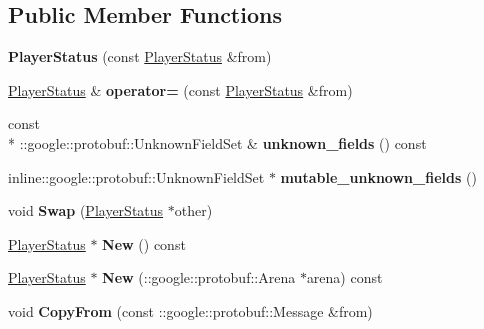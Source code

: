 \subsection*{Public Member Functions}
\begin{DoxyCompactItemize}
\item 
\hypertarget{class_player_status_a8869154aa29284c289564424ca3d81ca}{{\bfseries Player\-Status} (const \hyperlink{class_player_status}{Player\-Status} \&from)}\label{class_player_status_a8869154aa29284c289564424ca3d81ca}

\item 
\hypertarget{class_player_status_ad1150a8edc62109ee1ae7417ee476025}{\hyperlink{class_player_status}{Player\-Status} \& {\bfseries operator=} (const \hyperlink{class_player_status}{Player\-Status} \&from)}\label{class_player_status_ad1150a8edc62109ee1ae7417ee476025}

\item 
\hypertarget{class_player_status_ab7eee10cff7a50c69725159cf290352c}{const \\*
\-::google\-::protobuf\-::\-Unknown\-Field\-Set \& {\bfseries unknown\-\_\-fields} () const }\label{class_player_status_ab7eee10cff7a50c69725159cf290352c}

\item 
\hypertarget{class_player_status_abed60d55b4bcce83f29d29c1fe9c768e}{inline\-::google\-::protobuf\-::\-Unknown\-Field\-Set $\ast$ {\bfseries mutable\-\_\-unknown\-\_\-fields} ()}\label{class_player_status_abed60d55b4bcce83f29d29c1fe9c768e}

\item 
\hypertarget{class_player_status_a54451e7148d8bfc7ec996ff95296fbb6}{void {\bfseries Swap} (\hyperlink{class_player_status}{Player\-Status} $\ast$other)}\label{class_player_status_a54451e7148d8bfc7ec996ff95296fbb6}

\item 
\hypertarget{class_player_status_a5f463e20d20428030476245da9d6d52a}{\hyperlink{class_player_status}{Player\-Status} $\ast$ {\bfseries New} () const }\label{class_player_status_a5f463e20d20428030476245da9d6d52a}

\item 
\hypertarget{class_player_status_a05abd2f0659614a206ca97ac55cfece0}{\hyperlink{class_player_status}{Player\-Status} $\ast$ {\bfseries New} (\-::google\-::protobuf\-::\-Arena $\ast$arena) const }\label{class_player_status_a05abd2f0659614a206ca97ac55cfece0}

\item 
\hypertarget{class_player_status_af3573249f694a353dcfc7047af795730}{void {\bfseries Copy\-From} (const \-::google\-::protobuf\-::\-Message \&from)}\label{class_player_status_af3573249f694a353dcfc7047af795730}


\end{DoxyCompactItemize}
